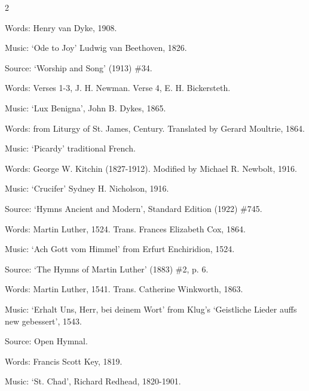 \begin{multicols}{2}
\par\noindent
Words: Henry van Dyke, 1908. 
\par\noindent
Music: `Ode to Joy' Ludwig van Beethoven, 1826.
\par\noindent
Source: `Worship and Song' (1913) \#34.


\par\noindent
Words: Verses 1-3, J. H. Newman. Verse 4, E. H. Bickersteth.
\par\noindent
Music: `Lux Benigna', John B. Dykes, 1865.


\par\noindent
Words: from Liturgy of St. James,  Century. Translated by Gerard Moultrie, 1864. 
\par\noindent
Music: `Picardy' traditional French.


\par\noindent
Words: George W. Kitchin (1827-1912). Modified by Michael R. Newbolt, 1916. 
\par\noindent
Music: `Crucifer' Sydney H. Nicholson, 1916.
\par\noindent
Source: `Hymns Ancient and Modern', Standard Edition (1922) \#745.


\newcolumn

\par\noindent
Words: Martin Luther, 1524. Trans. Frances Elizabeth Cox, 1864. 
\par\noindent
Music: `Ach Gott vom Himmel' from Erfurt Enchiridion, 1524.
\par\noindent
Source: `The Hymns of Martin Luther' (1883) \#2, p. 6.


\par\noindent
Words: Martin Luther, 1541.  Trans. Catherine Winkworth, 1863. 
\par\noindent
Music: `Erhalt Uns, Herr, bei deinem Wort' from Klug's `Geistliche Lieder auffs new gebessert', 1543. 
\par\noindent
Source: Open Hymnal.


\par\noindent
Words: Francis Scott Key, 1819.
\par\noindent
Music: `St. Chad', Richard Redhead, 1820-1901.



\end{multicols}
